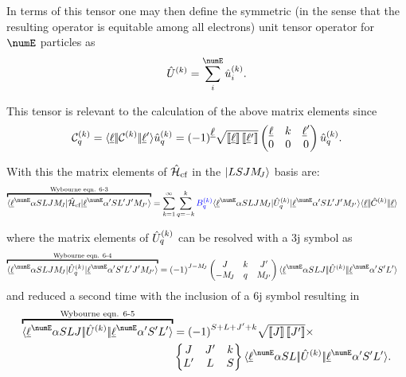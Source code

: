 \documentclass{article}
\begin{document}
In terms of this tensor one may then define the symmetric (in the sense that the resulting operator is equitable among all electrons) unit tensor operator for $\numE$ particles as
\begin{equation}
    \hat{U}^{(k)} = \sum_{i}^{\numE} \op{u}^{(k)}_i.
\end{equation}

This tensor is relevant to the calculation of the above matrix elements since 
\begin{equation}
    \mathcal{C}^{(k)}_q = \langle \underbar{$\ell$}|\!|\mathcal{C}^{(k)}|\!|\underbar{$\ell$}{'}\rangle \hat{u}^{(k)}_q 
        = {(-1)}^{\underbar{$\ell$}}
          \sqrt{\left[\!\left[\underbar{$\ell$}\right]\!\right]\left[\!\left[\underbar{$\ell$}{'}\right]\!\right]}
          \begin{pmatrix} \underbar{$\ell$} & k & \underbar{$\ell$}' \\ 0 & 0 & 0 \end{pmatrix} \hat{u}^{(k)}_q.
\end{equation}

With this the matrix elements of $\hat{\mathcal{H}}_\text{cf}$ in the $|LSJM_{\!{J}}\rangle$ basis are: 
\begin{align}
    \overbracket{\braopket{\lorb^\numE \alpha SLJ \Msub{J}}{\hamCrystalFieldSymbol}{\lorb^\numE \alpha'S L' J' \Msub{J'}}}^{\text{Wybourne eqn. 6-3}} &= \sum_{k=1}^\infty\sum_{q=-k}^k    
    \Bkq 
        \braopket{\lorb^\numE \alpha SLJ\Msub{J}}
            {\op{U}^{(k)}_q}
            {\lorb^\numE \alpha'SL'J'\Msub{J'}} 
        \redbraopket{\lorb}
            {\op{C}^{(k)}}
            {\lorb} 
\label{HCFsum}
\end{align}

where the matrix elements of $\hat{U}^{(k)}_q$ can be resolved with a 3j symbol as
\begin{align}
    \overbracket{\braopket{\lorb^\numE \alpha S L J \Msub{J}}
        {\op{U}^{(k)}_q}
        {\lorb^\numE \alpha' S' L' J' \Msub{J'}}}^
        {\text{Wybourne eqn. 6-4}}
        &= 
        \phaser{J-\Msub{J}}
        \threej{J}{k}{J'}
               {-\Msub{J}}{q}{\Msub{J'}}
    \redbraopket{\lorb^\numE \alpha S L J}
            {\op{U}^{(k)}}
            {\lorb^\numE \alpha' S' L'}
\end{align}
and reduced a second time with the inclusion of a 6j symbol resulting in
\begin{align}
    \nonumber \overbracket{\redbraopket{\lorb^\numE \alpha S L J}
        {\op{U}^{(k)}}
        {\lorb^\numE \alpha' S' L'}}^
        {\text{Wybourne eqn. 6-5}}
    &= 
    \phaser{S+L+J'+k} 
    \sqrt{\tpobraket{J}\tpobraket{J'}} \times \\
    & \sixj{J}{J'}{k}{L'}{L}{S}
    \redbraopket{\lorb^\numE \alpha S L}
        {\op{U}^{(k)}}
        {\lorb^\numE \alpha' S' L'}.
\end{align}
\end{document}
